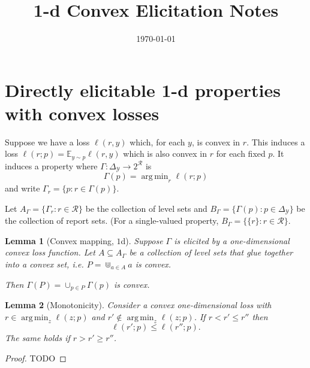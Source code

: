 \documentclass[12pt]{article}
\title{1-d Convex Elicitation Notes}
\date{\today}
\newcommand{\E}{\mathbb{E}}
\newcommand{\R}{\mathcal{R}}
\newcommand{\Y}{\mathcal{Y}}
\DeclareMathOperator*{\argmin}{arg\,min}
\newtheorem{lemma}{Lemma}
\theoremstyle{definition}
\begin{document}
\maketitle

\section{Directly elicitable 1-d properties with convex losses}

Suppose we have a loss $\ell(r,y)$ which, for each $y$, is convex in $r$.
This induces a loss $\ell(r;p) = \E_{y\sim p} \ell(r,y)$ which is also convex in $r$ for each fixed $p$.
It induces a property where $\Gamma: \Delta_{\Y} \to 2^{\R}$ is
  \[ \Gamma(p) = \argmin_r \ell(r;p) \]
and write $\Gamma_r = \{p : r \in \Gamma(p) \}$.

Let $A_{\Gamma} = \{\Gamma_r : r \in \R\}$ be the collection of level sets and $B_{\Gamma} = \{\Gamma(p) : p \in \Delta_{\Y}\}$ be the collection of report sets. (For a single-valued property, $B_{\Gamma} = \{\{r\} : r \in \R\}$.

%
\begin{lemma}[Convex mapping, $1$d] \label{lemma:convex-map}
  Suppose $\Gamma$ is elicited by a one-dimensional convex loss function.
  Let $A \subseteq A_{\Gamma}$ be a collection of level sets that glue together into a convex set, i.e. $P = \Cup_{a \in A} a$ is convex.

  Then $\Gamma(P) = \cup_{p \in P} \Gamma(p)$ is convex.
\end{lemma}

\begin{lemma}[Monotonicity] \label{lemma:monot}
  Consider a convex one-dimensional loss with $r \in \argmin_{z} \ell(z;p)$ and $r' \not\in \argmin_z \ell(z;p)$.
  If $r < r' \leq r''$ then
    \[ \ell(r';p) \leq \ell(r'';p) . \]
  The same holds if $r > r' \geq r''$.
\end{lemma}
\begin{proof}
  TODO
\end{proof}
\end{document}
